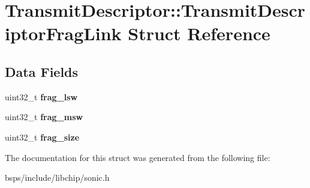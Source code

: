 \hypertarget{structTransmitDescriptor_1_1TransmitDescriptorFragLink}{}\section{Transmit\+Descriptor\+::Transmit\+Descriptor\+Frag\+Link Struct Reference}
\label{structTransmitDescriptor_1_1TransmitDescriptorFragLink}
\subsection*{Data Fields}
\begin{DoxyCompactItemize}
\item 
\mbox{\label{structTransmitDescriptor_1_1TransmitDescriptorFragLink_adf299306f9d92cbc6db3664b70ec74b6}} 
uint32\+\_\+t {\bfseries frag\+\_\+lsw}
\item 
\mbox{\label{structTransmitDescriptor_1_1TransmitDescriptorFragLink_a4f2a1b2b487e4241686d56c5079b3213}} 
uint32\+\_\+t {\bfseries frag\+\_\+msw}
\item 
\mbox{\label{structTransmitDescriptor_1_1TransmitDescriptorFragLink_afbb0702cf255cbd8badce51c91deea08}} 
uint32\+\_\+t {\bfseries frag\+\_\+size}
\end{DoxyCompactItemize}


The documentation for this struct was generated from the following file\+:\begin{DoxyCompactItemize}
\item 
bsps/include/libchip/sonic.\+h\end{DoxyCompactItemize}
